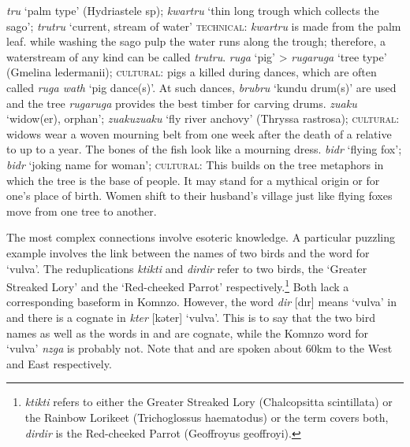 \begin{exe}
\ex
\label{ex639}
\begin{xlist}
	\ex \label{ex640} \emph{tru} `palm type' (Hydriastele sp); \emph{kwartru} `thin long trough which collects the sago'; \emph{trutru} `current, stream of water' \textsc{technical:} \emph{kwartru} is made from the palm leaf. while washing the sago pulp the water runs along the trough; therefore, a waterstream of any kind can be called \emph{trutru}.
	\ex \label{ex641} \emph{ruga} `pig' > \emph{rugaruga} `tree type' (Gmelina ledermanii); \textsc{cultural:} pigs a killed during dances, which are often called \emph{ruga wath} `pig dance(s)'. At such dances, \emph{brubru} `kundu drum(s)' are used and the tree \emph{rugaruga} provides the best timber for carving drums.
	\ex \label{ex642} \emph{zuaku} `widow(er), orphan'; \emph{zuakuzuaku} `fly river anchovy' (Thryssa rastrosa); \textsc{cultural:} widows wear a woven mourning belt from one week after the death of a relative to up to a year. The bones of the fish look like a mourning dress.
	\ex \label{ex643} \emph{bidr} `flying fox'; \emph{bidr} `joking name for woman'; \textsc{cultural:} This builds on the tree metaphors in which the tree is the base of people. It may stand for a mythical origin or for one's place of birth. Women shift to their husband's village just like flying foxes move from one tree to another.
\end{xlist}
\end{exe}%

The most complex connections involve esoteric knowledge. A particular puzzling example involves the link between the names of two birds and the word for `vulva'. The reduplications \emph{ktikti} and \emph{dirdir} refer to two birds, the  `Greater Streaked Lory' and the `Red-cheeked Parrot' respectively.\footnote{\emph{ktikti} refers to either the Greater Streaked Lory (Chalcopsitta scintillata) or the Rainbow Lorikeet (Trichoglossus haematodus) or the term covers both, \emph{dirdir} is the Red-cheeked Parrot (Geoffroyus geoffroyi).} Both lack a corresponding baseform in Komnzo. However, the word \emph{dir} [dır] means `vulva' in  and there is a cognate in  \emph{kter} [kəter] `vulva'. This is to say that the two bird names as well as the words in  and  are cognate, while the Komnzo word for `vulva' \emph{nzga} is probably not. Note that  and  are spoken about 60km to the West and East respectively.\\

